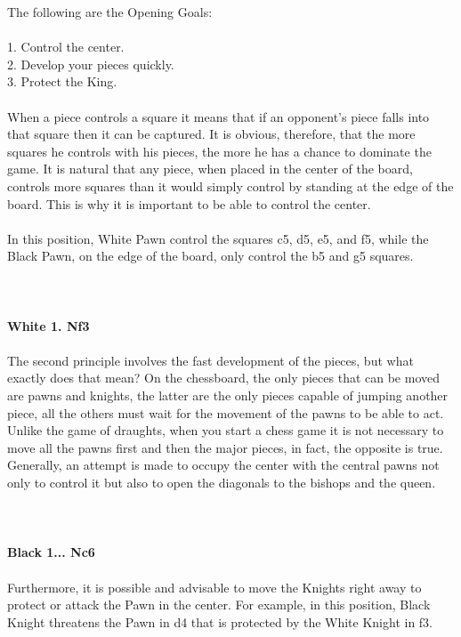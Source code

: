 \documentclass{article}
\begin{document}
The following are the Opening Goals:\\\\1. Control the center.\\2. Develop your pieces quickly.\\3. Protect the King.\\\\When a piece controls a square it means that if an opponent's piece falls into that square then it can be captured. It is obvious, therefore, that the more squares he controls with his pieces, the more he has a chance to dominate the game. It is natural that any piece, when placed in the center of the board, controls more squares than it would simply control by standing at the edge of the board. This is why it is important to be able to control the center.\\\\In this position, White Pawn control the squares c5, d5, e5, and f5, while the Black Pawn, on the edge of the board, only control the b5 and g5 squares.\\
\\

\\
\\
\textbf{White 1. Nf3}\\
\\
The second principle involves the fast development of the pieces, but what exactly does that mean? On the chessboard, the only pieces that can be moved are pawns and knights, the latter are the only pieces capable of jumping another piece, all the others must wait for the movement of the pawns to be able to act. Unlike the game of draughts, when you start a chess game it is not necessary to move all the pawns first and then the major pieces, in fact, the opposite is true.\\Generally, an attempt is made to occupy the center with the central pawns not only to control it but also to open the diagonals to the bishops and the queen.\\
\\

\\
\\
\textbf{Black 1... Nc6}\\
\\
Furthermore, it is possible and advisable to move the Knights right away to protect or attack the Pawn in the center. For example, in this position, Black Knight threatens the Pawn in d4 that is protected by the White Knight in f3.\\
\end{document}

